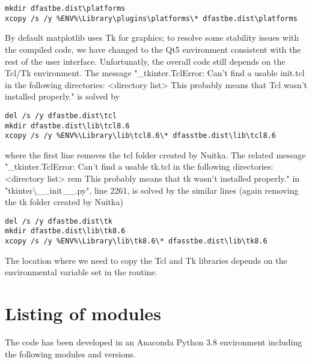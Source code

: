 \begin{Verbatim}
mkdir dfastbe.dist\platforms
xcopy /s /y %ENV%\Library\plugins\platforms\* dfastbe.dist\platforms
\end{Verbatim}

By default matplotlib uses Tk for graphics; to resolve some stability issues with the compiled code, we have changed to the Qt5 environment consistent with the rest of the user interface.
Unfortunatly, the overall code still depends on the Tcl/Tk environment.
The message "\_tkinter.TclError: Can't find a usable init.tcl in the following directories: <directory list> This probably means that Tcl wasn't installed properly." is solved by

\begin{Verbatim}
del /s /y dfastbe.dist\tcl
mkdir dfastbe.dist\lib\tcl8.6
xcopy /s /y %ENV%\Library\lib\tcl8.6\* dfasstbe.dist\lib\tcl8.6
\end{Verbatim}

where the first line removes the tcl folder created by Nuitka.
The related message "\_tkinter.TclError: Can't find a usable tk.tcl in the following directories: <directory list> rem This probably means that tk wasn't installed properly." in "tkinter\textbackslash{}\_\_init\_\_.py", line 2261, is solved by the similar lines (again removing the tk folder created by Nuitka)

\begin{Verbatim}
del /s /y dfastbe.dist\tk
mkdir dfastbe.dist\lib\tk8.6
xcopy /s /y %ENV%\Library\lib\tk8.6\* dfasstbe.dist\lib\tk8.6
\end{Verbatim}

The location where we need to copy the Tcl and Tk libraries depends on the environmental variable  set in the  routine.

\section{Listing of modules}

The code has been developed in an Anaconda Python 3.8 environment including the following modules and versions.

